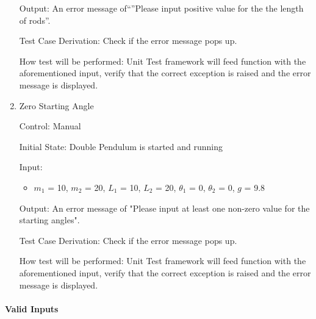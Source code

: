 \documentclass[12pt, titlepage]{article}
\begin{document}
\begin{enumerate}
\begin{itemize}
\end{itemize}



Output: An error message of``''Please input positive value for the the  length of rods''.

Test Case Derivation: Check if the error message pops up. 

How test will be performed: Unit Test framework will feed function with the aforementioned input, verify that the correct exception is raised and the error message is displayed.
           
\item{Zero Starting Angle}  

  Control: Manual  
          
  Initial State: Double Pendulum is started and running
          
  Input: 
  \begin{itemize}
  \item $m_1$ = 10, $m_2$ = 20, $L_1$ = 10, $L_2$ = 20, $\theta_1$ = 0, $\theta_2$ = 0, $g$ = 9.8
  \end{itemize}

  Output: An error message of "Please input at least one non-zero value for the starting angles".

  Test Case Derivation: Check if the error message pops up.

  How test will be performed: Unit Test framework will feed function with the aforementioned input, verify that the correct exception is raised and the error message is displayed.
  
\end{enumerate}

\paragraph{Valid Inputs}
\end{document}

